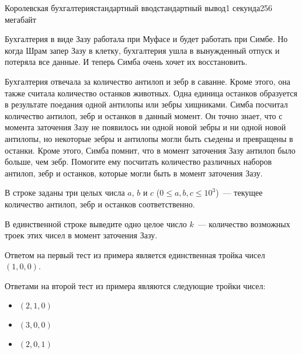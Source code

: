 \begin{problem}{Королевская бухгалтерия}{стандартный ввод}{стандартный вывод}{1 секунда}{256 мегабайт}

Бухгалтерия в виде Зазу работала при Муфасе и будет работать при Симбе. Но когда Шрам запер Зазу в клетку,
бухгалтерия ушла в вынужденный отпуск и потеряла все данные. И теперь Симба очень хочет их восстановить.

Бухгалтерия отвечала за количество антилоп и зебр в саванне. Кроме этого, она также считала количество останков животных. 
Одна единица останков образуется в результате поедания одной антилопы или зебры хищниками. Симба посчитал количество антилоп, 
зебр и останков в данный момент. Он точно знает, что с момента заточения Зазу не появилось ни одной новой зебры и ни одной новой 
антилопы, но некоторые зебры и антилопы могли быть съедены и превращены в останки. Кроме этого, Симба помнит, что в момент заточения 
Зазу антилоп было больше, чем зебр. Помогите ему посчитать количество различных наборов антилоп, зебр и останков, которые могли 
быть в момент заточения Зазу.

\InputFile
В строке заданы три целых числа $a$, $b$ и $c$ ($0 \le a, b, c \le 10^3$)~--- текущее количество антилоп, зебр и останков 
соответственно.

\OutputFile
В единственной строке выведите одно целое число $k$~--- количество возможных троек этих чисел в момент заточения Зазу.

\Examples

\begin{example}
%
%
\end{example}

\Note
Ответом на первый тест из примера является единственная тройка чисел $(1, 0, 0)$.

Ответами на второй тест из примера являются следующие тройки чисел:
\begin{itemize}
\item$(2, 1, 0)$
\item$(3, 0, 0)$
\item$(2, 0, 1)$
\end{itemize}

\end{problem}

